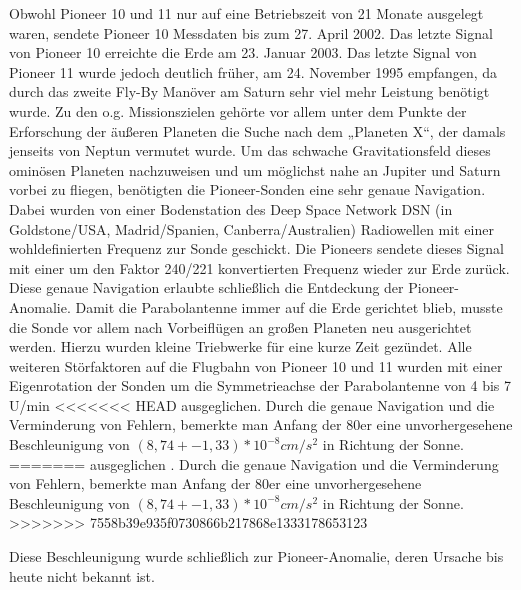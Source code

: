 Obwohl Pioneer 10 und 11 nur auf eine Betriebszeit von 21 Monate
ausgelegt waren, sendete Pioneer 10 Messdaten bis zum 27. April 2002.
Das letzte Signal von Pioneer 10 erreichte die Erde am 23. Januar 2003.
Das letzte Signal von Pioneer 11 wurde jedoch deutlich früher, am 24.
November 1995 empfangen, da durch das zweite Fly-By Manöver am Saturn
sehr viel mehr Leistung benötigt wurde.
Zu den o.g. Missionszielen gehörte vor allem unter dem Punkte der
Erforschung der äußeren Planeten die Suche nach dem „Planeten X“, der
damals jenseits von Neptun vermutet wurde. Um das schwache
Gravitationsfeld dieses ominösen Planeten nachzuweisen und um möglichst
nahe an Jupiter und Saturn vorbei zu fliegen, benötigten die
Pioneer-Sonden eine sehr genaue Navigation. Dabei wurden von einer
Bodenstation des Deep Space Network DSN (in Goldstone/USA,
Madrid/Spanien, Canberra/Australien) Radiowellen mit einer
wohldefinierten Frequenz zur Sonde geschickt. Die Pioneers sendete
dieses Signal mit einer um den Faktor 240/221 konvertierten Frequenz
wieder zur Erde zurück\cite{Dittus2006}. Diese genaue
Navigation erlaubte schließlich die Entdeckung der Pioneer-Anomalie. 
Damit die Parabolantenne immer auf die Erde gerichtet blieb, musste
die Sonde vor allem nach Vorbeiflügen an großen Planeten neu
ausgerichtet werden. Hierzu wurden kleine Triebwerke für eine kurze
Zeit gezündet. Alle weiteren Störfaktoren auf die Flugbahn von Pioneer
10 und 11 wurden mit einer Eigenrotation der Sonden um die
Symmetrieachse der Parabolantenne von 4 bis 7 U/min
<<<<<<< HEAD
ausgeglichen\cite{Dittus2006}\cite{Nieto2007}.
Durch die genaue Navigation und die Verminderung von Fehlern,
bemerkte man Anfang der 80er eine unvorhergesehene Beschleunigung von
$(8,74+-1,33)*10^{-8} cm/s^{2}$ \cite{Anderson2002} in Richtung der Sonne. 
=======
ausgeglichen\cite{Dittus2006} \cite{Nieto2007}.
Durch die genaue Navigation und die Verminderung von Fehlern,
bemerkte man Anfang der 80er eine unvorhergesehene Beschleunigung von
$(8,74+-1,33)*10^{-8} cm/s^{2}$ \cite{Anderson2002}in Richtung der Sonne. 
>>>>>>> 7558b39e935f0730866b217868e1333178653123

Diese Beschleunigung wurde schließlich zur Pioneer-Anomalie, deren
Ursache bis heute nicht bekannt ist.
